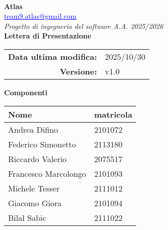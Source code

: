 \documentclass[a4paper,12pt]{article}
\makeatletter
\newcommand{\Gruppo}{Atlas}
\newcommand{\Email}{\href{mailto:team9.atlas@gmail.com}{\textcolor{blue}{\underline{team9.atlas@gmail.com}}}}
\newcommand{\TitoloUno}{Lettera di Presentazione}
\newcommand{\DataModifica}{2025/10/30}
\newcommand{\LogoGruppo}{img/AtlasLogo.png} %
\newcommand{\VersioneDocumento}{v1.0} %
\makeatother
\begin{document}
\begin{titlepage}
    \centering

    \vspace*{0cm}
    \\[0.8cm]

    {\LARGE \textbf{\Gruppo}}\\[0.1cm]
    {\large \Email}\\[1.2cm]

    {\Large \textit{Progetto di ingegneria del software A.A. 2025/2026}}\\[1.5cm]

    {\Huge \textbf{\TitoloUno}}\\[.5cm]

    \begin{tabular}{rl}
        \textbf{Data ultima modifica:} & \DataModifica \\
        \textbf{Versione:} & \VersioneDocumento \\
    \end{tabular}

    \hspace{1cm}

     {\large \textbf{Componenti}}\\[0.5cm]
    \begin{tabular}{l|l}
        \textbf{Nome} & \textbf{matricola} \\
        \hline
        Andrea Difino & 2101072 \\
        Federico Simonetto & 2113180 \\
        Riccardo Valerio & 2075517 \\
        Francesco Marcolongo & 2101093 \\
        Michele Tesser & 2111012 \\
        Giacomo Giora & 2101094 \\
        Bilal Sabic & 2111022 \\
    \end{tabular}

\end{titlepage}
\end{document}
